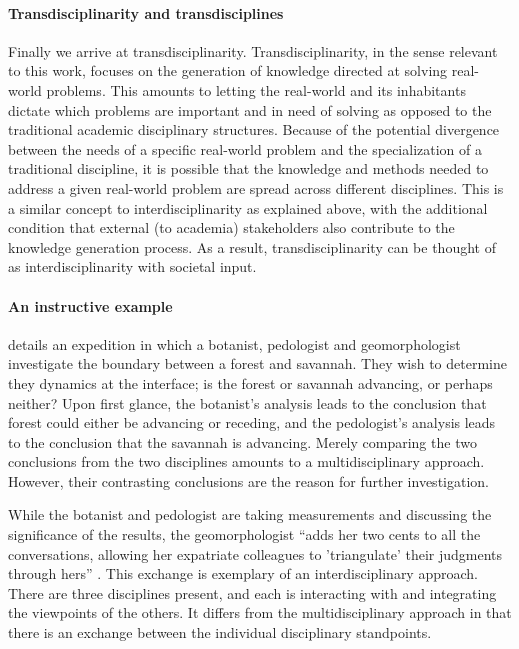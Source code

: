 \documentclass[a4paper]{article}
\begin{document}
\paragraph{Transdisciplinarity and transdisciplines}

Finally we arrive at transdisciplinarity. Transdisciplinarity, in the sense
relevant to this work, focuses on the generation of knowledge directed at
solving real-world problems. This amounts to letting the real-world and its
inhabitants dictate which problems are important and in need of solving as
opposed to the traditional academic disciplinary structures. Because of the
potential divergence between the needs of a specific real-world problem and
the specialization of a traditional discipline, it is possible that the
knowledge and methods needed to address a given real-world problem are spread
across different disciplines. This is a similar concept to interdisciplinarity
as explained above, with the additional condition that external (to academia)
stakeholders also contribute to the knowledge generation process. As a result,
transdisciplinarity can be thought of as interdisciplinarity with societal
input. 

\paragraph{An instructive example}

\cite{latour1999circulating} details an expedition in which a botanist,
pedologist and geomorphologist investigate the boundary between a forest and
savannah. They wish to determine they dynamics at the interface; is the forest
or savannah advancing, or perhaps neither? Upon first glance, the botanist's
analysis leads to the conclusion that forest could either be advancing or
receding, and the pedologist's analysis leads to the conclusion that the
savannah is advancing.  Merely comparing the two conclusions from the two
disciplines amounts to a multidisciplinary approach. However, their
contrasting conclusions are the reason for further investigation.

While the botanist and pedologist are taking measurements and discussing the
significance of the results, the geomorphologist ``adds her two cents to all
the conversations, allowing her expatriate colleagues to 'triangulate' their
judgments through hers'' \citep{latour1999circulating}. This exchange is
exemplary of an interdisciplinary approach. There are three disciplines
present, and each is interacting with  and integrating the viewpoints of the
others. It differs from the multidisciplinary approach in that there is an
exchange between the individual disciplinary standpoints.
\end{document}
